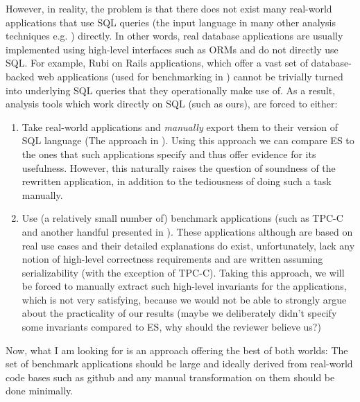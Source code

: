 \documentclass[12pt,letter]{article}
\begin{document}
However, in reality, the problem is that there does not exist many real-world
applications that use SQL queries (the input language in many other analysis
techniques e.g. \cite{Kaki:Alone,Wang:DB_equal}) directly. In other words, real database applications
are usually implemented
using high-level interfaces such as ORMs and do not directly use SQL. For
example, Rubi on Rails applications,
which offer a vast set of database-backed web applications (used for benchmarking
in \cite{Bailis:Feral}) cannot be trivially turned into underlying SQL queries that
they operationally make use of. As a result, analysis tools which work directly
on SQL (such as ours),
are forced to either:
\begin{enumerate}
  \item Take real-world applications and \emph{manually} export them to their
    version of
    SQL language (The approach in \cite{Wang:DB_equal}). Using this approach we can
    compare ES to the ones that such applications specify and thus offer
    evidence for its usefulness. However, this naturally raises the question of
    soundness of the rewritten application, in addition to the tediousness of doing such a
    task manually.
  \item Use (a relatively small number of) benchmark applications (such as TPC-C
    and another handful presented in \cite{Difallah:OLTP_Bench}). These applications
    although are based on real use cases and their detailed explanations do
    exist, unfortunately, lack any notion of high-level correctness requirements and are
    written assuming serializability (with the exception of TPC-C). 
    Taking this approach, we will be forced to manually extract such high-level
    invariants for the applications, which is not very satisfying, because we
    would not be able to strongly argue about the practicality of our results (maybe we
    deliberately didn't specify some invariants compared to ES, why should the reviewer believe
    us?)
  \end{enumerate}
Now, what I am looking for is an approach offering the best of both worlds: The
set of
benchmark applications should be large and ideally derived from real-world code
bases such as github and any manual transformation on them should be done 
minimally.





\end{document}
